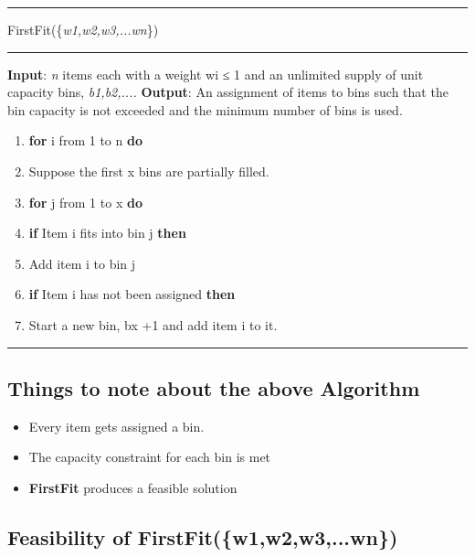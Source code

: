\documentclass{article}
\begin{document}
\noindent\rule[0.5ex]{\linewidth}{1pt}
FirstFit(\{\textit{w1,w2,w3,...wn}\})
\newline
\noindent\rule[0.5ex]{\linewidth}{1pt}
\textbf{Input}: \textit{n} items each with a weight wi ≤ 1 and an unlimited supply of unit capacity bins,\textit{ b1,b2,....}
\newline
\textbf{Output}: An assignment of items to bins such that the bin capacity is not exceeded and the minimum number of bins is used.
\begin{enumerate}
\item \textbf{for} i from 1 to n \textbf{do}
\item \tab Suppose the first x bins are partially filled.
\item \tab \textbf{for} j from 1 to x \textbf{do}
\item \tab \tab \textbf{if} Item i fits into bin j \textbf{then}
\item \tab \tab Add item i to bin j
\item \tab \textbf{if} Item i has not been assigned \textbf{then}
\item \tab \tab Start a new bin, bx +1 and add item i to it.
\end{enumerate}

\newline
\noindent\rule[0.5ex]{\linewidth}{1pt}
\subsection{Things to note about the above Algorithm }
\begin{itemize}
\item Every item gets assigned a bin.
\item The capacity constraint for each bin is met
\item \textbf{FirstFit} produces a feasible solution
\end{itemize}


\subsection{Feasibility of FirstFit(\{w1,w2,w3,...wn\})}
\end{document}
